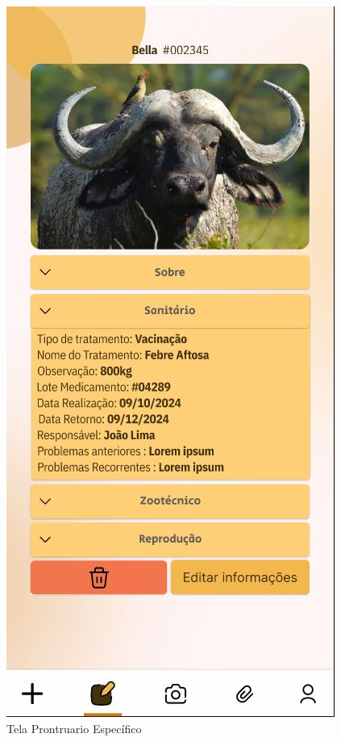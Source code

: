 \newpage
\begin{figure}[!h]
\centering
\caption{Tela Prontruario Específico}%
\label{fig:ux-mobile03}
\includegraphics[scale=0.4]{Illustrations/UX-Mobile/Mobi-03.02.JPG}

\end{figure}
